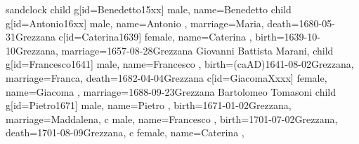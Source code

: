 \documentclass{article}
\begin{document}
\begin{midpage}
\begin{center}

\begin{genealogypicture}[
    processing=database,
    database format=full,
    timeflow=right,
    node size=1.7cm,
    level size=3.5cm,
    level distance=6mm,
    list separators hang=3mm,
    name font=\bfseries,
    surn code={\textcolor{black!50!black}{#1}},
    place text={\newline}{},
    date format=d month yyyy,
    tcbset={male/.style={colframe=blue,colback=blue!5},
    female/.style={colframe=red,colback=red!5}},
    box={fit basedim=7pt,boxsep=2pt,segmentation style=solid,
        halign=left,before upper=\parskip1pt,
        \gtrDBsex,
    },
]
sandclock
{
    child{
        g[id=Benedetto15xx]{
            male,
            name={Benedetto }
        }
        child{
            g[id=Antonio16xx]{
                male,
                name={Antonio },
                marriage={Maria}{},
                death={1680-05-31}{Grezzana}
            }
            c[id=Caterina1639]{
                female,
                name={Caterina },
                birth={1639-10-10}{Grezzana},
                marriage={1657-08-28}{Grezzana \newline Giovanni Battista Marani},
            }
            child{
                g[id=Francesco1641]{
                    male,
                    name={Francesco },
                    birth={(caAD)1641-08-02}{Grezzana},
                    marriage={Franca}{},
                    death={1682-04-04}{Grezzana}
                }
                c[id=GiacomaXxxx]{
                    female,
                    name={Giacoma },
                    marriage={1688-09-23}{Grezzana \newline Bartolomeo Tomasoni}
                }
                child{
                    g[id=Pietro1671]{
                        male,
                        name={Pietro },
                        birth={1671-01-02}{Grezzana},
                        marriage={Maddalena}{},
                    }
                    c{
                        male,
                        name={Francesco },
                        birth={1701-07-02}{Grezzana},
                        death={1701-08-09}{Grezzana},
                    }
                    c{
                        female,
                        name={Caterina },
}}}}}}
\end{genealogypicture}
\end{center}
\end{midpage}
\end{document}
